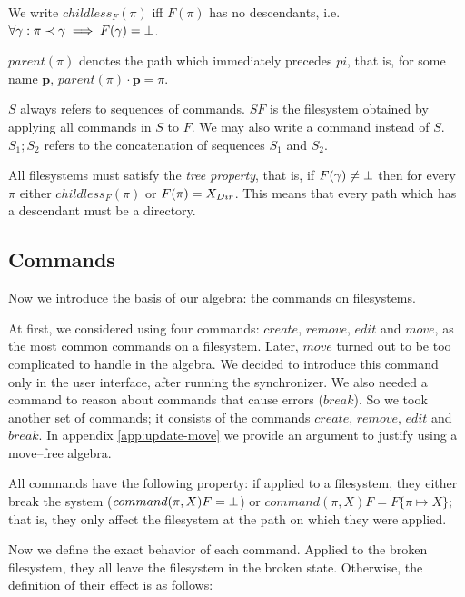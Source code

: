 We write \(childless_F(\pi)\) iff \(F(\pi)\) has no descendants,
i.e. \(\forall\gamma: \pi\prec\gamma\implies F(\gamma)=\bot\).

\(parent(\pi)\) denotes the path which immediately precedes \(pi\), that
is, for some name \(\mathbf{p}\), \(parent(\pi)\cdot \mathbf{p}=\pi\).

\(S\) always refers to sequences of commands. \(SF\) is the filesystem
obtained by applying all commands in \(S\) to \(F\). We may also write a
command instead of \(S\). \(S_1;S_2\) refers to the concatenation of
sequences \(S_1\) and \(S_2\).

All filesystems must satisfy
the \emph{tree property}, that
is, if \(F(\gamma)\neq\bot\) then for every \(\pi\) either
\(childless_F(\pi)\) or \(F(\pi)=X_{Dir}\).
This means that every path which has a descendant must
be a directory.

\subsection{Commands}

Now we introduce the basis of our algebra: the commands on filesystems.

At first, we
considered using four commands: \(create\), \(remove\), \(edit\) and
\(move\), as the most common commands on a filesystem. Later, \(move\)
turned out to be too complicated to handle in the algebra. We decided to introduce
this command only in the user interface, after running the synchronizer.
We also needed a command to reason about commands that cause errors
(\(break\)). So we took another set of commands; it consists of the
commands \(create\), \(remove\), \(edit\) and \(break\). In appendix
\ref{app:update-move} we provide an argument to justify using a
move--free
algebra.

All commands have the following property: if applied to a filesystem,
they either break the system (\(command(\pi,X)F=\bot\)) or 
\(command(\pi,X)F=F\{\pi\mapsto X\}\); that is, they only affect the filesystem at the path on which
they were applied. 

Now we define the exact behavior of each command.
Applied to the broken filesystem, they all leave
the filesystem in the broken state. Otherwise, 
the definition of their effect is as follows: 

